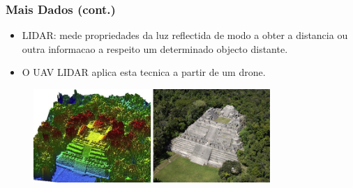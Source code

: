 \documentclass[hyperref={pdfpagelabels=true}]{beamer}
\begin{document}
\begin{frame}
\frametitle{Mais Dados (cont.)}
      \begin{itemize}
        \item<1->LIDAR: mede propriedades da luz reflectida de modo a obter a distancia ou outra informacao a respeito um determinado objecto distante.
        \item<2->O UAV LIDAR aplica esta tecnica a partir de um drone.%
      \end{itemize}                
    \begin{figure}   
         \includegraphics[width=0.8\textwidth]{lidar.jpg} %
    \end{figure} 
            
\end{frame}
\end{document}
